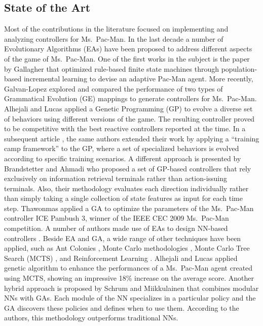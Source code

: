 \documentclass[journal]{IEEEtran}
\begin{document}
\subsection{State of the Art}
Most of the contributions in the literature focused on implementing and analyzing controllers for Ms.\  Pac-Man. In the last decade a number of Evolutionary Algorithms (EAs) have been proposed to address different aspects of the game of Ms.\  Pac-Man. One of the first works in the subject is the paper by Gallagher \cite{Gallagher03} that optimized rule-based finite state machines through population-based incremental learning to devise an adaptive Pac-Man agent. More recently, Galvan-Lopez \cite{Galvan-Lopez10} explored and compared the performance of two types of Grammatical Evolution (GE) mappings to generate controllers for Ms.\  Pac-Man. Alhejali and Lucas \cite{Alhejali10} applied a Genetic Programming (GP) to evolve a diverse set of behaviors using different versions of the game. The resulting controller proved to be competitive with the best reactive controllers reported at the time. In a subsequent article \cite{AlhejaliLucas11}, the same authors extended their work by applying a ``training camp framework'' to the GP, where a set of specialized behaviors is evolved according to specific training scenarios. A different approach is presented by Brandstetter and Ahmadi \cite{Brandstetter12} who proposed a set of GP-based controllers that rely exclusively on information retrieval terminals rather than action-issuing terminals. Also, their methodology evaluates each direction individually rather than simply taking a single collection of state features as input for each time step. Thawonmas \cite{Thawonmas10} applied a GA to optimize the parameters of the Ms.\  Pac-Man controller ICE Pambush 3, winner of the IEEE CEC 2009 Ms.\  Pac-Man competition. A number of authors made use of EAs to design NN-based controllers \cite{Lucas05,Burrow09,Keunhyun10}. Beside EA and GA, a wide range of other techniques have been applied, such as  Ant Colonies \cite{Emilio2010}, Monte Carlo methodologies \cite{Tong2010,Tong2011}, Monte Carlo Tree Search (MCTS) \cite{Samothrakis2011, Ikehata2011}, and Reinforcement Learning \cite{Bom2013}. Alhejali and Lucas \cite{Alhejali2013} applied genetic algorithm to enhance the performances of a Ms.\  Pac-Man agent created using MCTS, showing an impressive 18\% increase on the average score. Another hybrid approach is proposed by Schrum and Miikkulainen \cite{Schrum2014} that combines modular NNs with GAs. Each module of the NN specializes in a particular policy and the GA discovers these policies and defines when to use them. According to the authors, this methodology outperforms traditional NNs.
\end{document}
